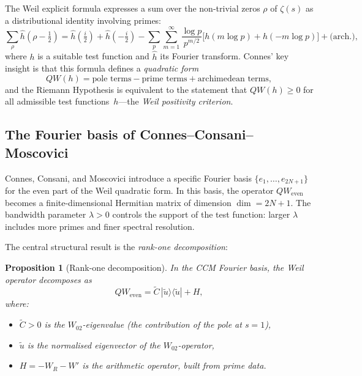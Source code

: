\documentclass[12pt,a4paper]{article}
\newtheorem{proposition}[theorem]{Proposition}
\theoremstyle{definition}
\theoremstyle{remark}
\newcommand{\utilde}{\tilde{u}}
\newcommand{\Ctilde}{\tilde{C}}
\begin{document}
The Weil explicit formula \cite{Weil1952} expresses a sum over the
non-trivial zeros $\rho$ of $\zeta(s)$ as a distributional identity
involving primes:
\begin{equation}
\label{eq:weil}
\sum_\rho \hat{h}(\rho - \tfrac{1}{2})
= \hat{h}(\tfrac{i}{2}) + \hat{h}(-\tfrac{i}{2})
- \sum_p \sum_{m=1}^\infty \frac{\log p}{p^{m/2}}
  \bigl[h(m\log p) + h(-m\log p)\bigr]
+ \text{(arch.)},
\end{equation}
where $h$ is a suitable test function and $\hat{h}$ its Fourier
transform.
Connes' key insight \cite{Connes1999} is that this formula defines
a \emph{quadratic form}
\begin{equation}
\label{eq:QW-def}
QW(h) = \text{pole terms} - \text{prime terms} + \text{archimedean terms},
\end{equation}
and the Riemann Hypothesis is equivalent to the statement that
$QW(h) \geq 0$ for all admissible test functions~$h$---the
\emph{Weil positivity criterion}.

\subsection{The Fourier basis of Connes--Consani--Moscovici}

Connes, Consani, and Moscovici \cite{CCM2025} introduce a specific
Fourier basis $\{e_1, \ldots, e_{2N+1}\}$ for the even part of the
Weil quadratic form.
In this basis, the operator $QW_{\mathrm{even}}$ becomes a
finite-dimensional Hermitian matrix of dimension $\dim = 2N+1$.
The bandwidth parameter $\lambda > 0$ controls the support of the
test function: larger $\lambda$ includes more primes and finer
spectral resolution.

The central structural result is the \emph{rank-one decomposition}:

\begin{proposition}[Rank-one decomposition]
\label{prop:rank1}
In the CCM Fourier basis, the Weil operator decomposes as
\begin{equation}
\label{eq:rank1}
QW_{\mathrm{even}} = \Ctilde \, |\utilde\rangle\langle\utilde| + H,
\end{equation}
where:
\begin{itemize}
\item $\Ctilde > 0$ is the $W_{02}$-eigenvalue (the contribution of
  the pole at $s = 1$),
\item $\utilde$ is the normalised eigenvector of the $W_{02}$-operator,
\item $H = -W_R - W'$ is the arithmetic operator, built from prime data.
\end{itemize}
\end{proposition}
\end{document}
